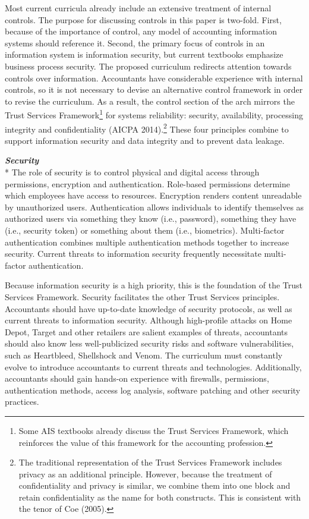 \documentclass[12pt]{article}
\newcommand{\SubSubSection}[1]{{\centering{}\normalsize{}\textbf{\emph{#1}}}\\*\indent{}}
\begin{document}
Most current curricula already include an extensive treatment of internal controls. The purpose for discussing controls in this paper is two-fold. First, because of the importance of control, any model of accounting information systems should reference it. Second, the primary focus of controls in an information system is information security, but current textbooks emphasize business process security. The proposed curriculum redirects attention towards controls over information. Accountants have considerable experience with internal controls, so it is not necessary to devise an alternative control framework in order to revise the curriculum. As a result, the control section of the arch mirrors the Trust Services Framework\footnote{Some AIS textbooks already discuss the Trust Services Framework, which reinforces the value of this framework for the accounting profession.} for systems reliability: security, availability, processing integrity and confidentiality (AICPA 2014).\footnote{The traditional representation of the Trust Services Framework includes privacy as an additional principle. However, because the treatment of confidentiality and privacy is similar, we combine them into one block and retain confidentiality as the name for both constructs. This is consistent with the tenor of Coe (2005).} These four principles combine to support information security and data integrity and to prevent data leakage.

\SubSubSection{Security}
The role of security is to control physical and digital access through permissions, encryption and authentication. Role-based permissions determine which employees have access to resources. Encryption renders content unreadable by unauthorized users. Authentication allows individuals to identify themselves as authorized users via something they know (i.e., password), something they have (i.e., security token) or something about them (i.e., biometrics). Multi-factor authentication combines multiple authentication methods together to increase security. Current threats to information security frequently necessitate multi-factor authentication.

Because information security is a high priority, this is the foundation of the Trust Services Framework. Security facilitates the other Trust Services principles. Accountants should have up-to-date knowledge of security protocols, as well as current threats to information security. Although high-profile attacks on Home Depot, Target and other retailers are salient examples of threats, accountants should also know less well-publicized security risks and software vulnerabilities, such as Heartbleed, Shellshock and Venom. The curriculum must constantly evolve to introduce accountants to current threats and technologies. Additionally, accountants should gain hands-on experience with firewalls, permissions, authentication methods, access log analysis, software patching and other security practices.
\end{document}
